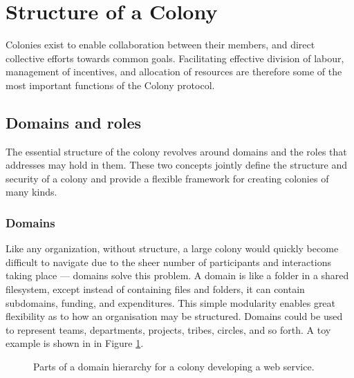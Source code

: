 \section{Structure of a Colony}\label{sec:colony-structure}
Colonies exist to enable collaboration between their members, and direct collective efforts towards common goals. Facilitating effective division of labour, management of incentives, and allocation of resources are therefore some of the most important functions of the Colony protocol.

\subsection{Domains and roles}\label{sec:domains}\label{sec:roles}

The essential structure of the colony revolves around domains and the roles that addresses may hold in them. These two concepts jointly define the structure and security of a colony and provide a flexible framework for creating colonies of many kinds.

\subsubsection{Domains}

Like any organization, without structure, a large colony would quickly become difficult to navigate due to the sheer number of participants and interactions taking place --- domains solve this problem. A domain is like a folder in a shared filesystem, except instead of containing files and folders, it can contain subdomains, funding, and expenditures. This simple modularity enables great flexibility as to how an organisation may be structured. Domains could be used to represent teams, departments, projects, tribes, circles, and so forth. A toy example is shown in in Figure \ref{fig:domainhierarchysample}.

\begin{figure}[h]
    \centering
 \caption{Parts of a domain hierarchy for a colony developing a web service.}
 \label{fig:domainhierarchysample}

\end{figure}

